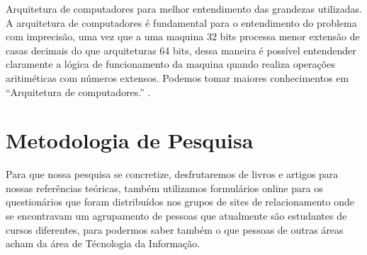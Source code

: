 \documentclass[
	12pt,				%
	oneside,			%
	a4paper,			%
	english,			%
	french,				%
	spanish,			%
	brazil,				%
	]{abntex2}
\begin{document}
 Arquitetura de computadores para melhor entendimento das grandezas utilizadas.
A arquitetura de computadores é fundamental para o entendimento do problema com imprecisão, uma vez que a uma maquina 32 bits processa menor extensão de casas decimais do que arquiteturas 64 bits, dessa maneira é possível entendender claramente a lógica de funcionamento da maquina quando realiza operações aritiméticas com números extensos. Podemos tomar maiores conhecimentos em “Arquitetura de computadores.” \cite{juniorarquitetura} .
\chapter{Metodologia de Pesquisa}
Para que nossa pesquisa se concretize, desfrutaremos de livros e artigos para nossas referências teóricas, também utilizamos formulários online para os questionários que foram distribuídos nos grupos de sites de relacionamento onde se encontravam um agrupamento de pessoas que atualmente s\~{a}o estudantes de cursos diferentes, para podermos saber também o que pessoas de outras áreas acham da área de Técnologia da Informaç\~{a}o.


 	




\end{document}
